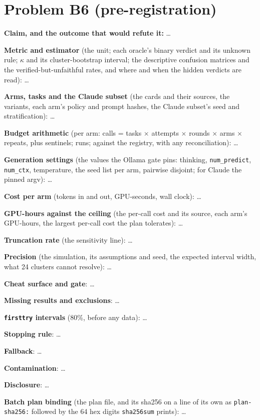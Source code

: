 \documentclass[11pt]{article}
\begin{document}
\section*{Problem B6 (pre-registration)}\label{ans:B6}
\begin{answer}
\textbf{Claim, and the outcome that would refute it:} \dots

\textbf{Metric and estimator} (the unit; each oracle's binary verdict and its
unknown rule; $\kappa$ and its cluster-bootstrap interval; the descriptive
confusion matrices and the verified-but-unfaithful rates, and where and when
the hidden verdicts are read): \dots

\textbf{Arms, tasks and the Claude subset} (the cards and their sources, the
variants, each arm's policy and prompt hashes, the Claude subset's seed and
stratification): \dots

\textbf{Budget arithmetic} (per arm: calls = tasks $\times$ attempts $\times$
rounds $\times$ arms $\times$ repeats, plus sentinels; runs; against the
registry, with any reconciliation): \dots

\textbf{Generation settings} (the values the Ollama gate pins: thinking,
\texttt{num\_predict}, \texttt{num\_ctx}, temperature, the seed list per arm,
pairwise disjoint; for Claude the pinned argv): \dots

\textbf{Cost per arm} (tokens in and out, GPU-seconds, wall clock): \dots

\textbf{GPU-hours against the ceiling} (the per-call cost and its source, each
arm's GPU-hours, the largest per-call cost the plan tolerates): \dots

\textbf{Truncation rate} (the sensitivity line): \dots

\textbf{Precision} (the simulation, its assumptions and seed, the expected
interval width, what 24 clusters cannot resolve): \dots

\textbf{Cheat surface and gate}: \dots

\textbf{Missing results and exclusions}: \dots

\textbf{\texttt{firsttry} intervals} (80\%, before any data): \dots

\textbf{Stopping rule}: \dots

\textbf{Fallback}: \dots

\textbf{Contamination}: \dots

\textbf{Disclosure}: \dots

\textbf{Batch plan binding} (the plan file, and its sha256 on a line of its own
as \texttt{plan-sha256:} followed by the 64 hex digits \texttt{sha256sum}
prints): \dots
\end{answer}
\end{document}
